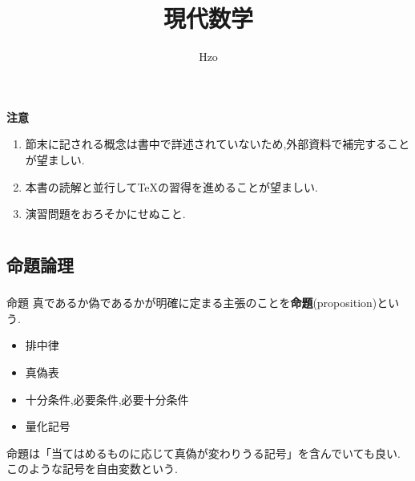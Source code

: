 \documentclass[dvipdfmx,b4j]{jsarticle}
\begin{document}
\title{現代数学}
\author{Hzo}
\maketitle

\begin{framed}
\textbf{注意}
\begin{enumerate}
    \item 節末に記される概念は書中で詳述されていないため,外部資料で補完することが望ましい.
    \item 本書の読解と並行して\TeX の習得を進めることが望ましい.
    \item 演習問題をおろそかにせぬこと.
\end{enumerate}
\end{framed}
\tableofcontents

\section{}
\subsection{命題論理}
\subsubsection{}
\begin{definition}{命題}{}
真であるか偽であるかが明確に定まる主張のことを\textbf{命題}(proposition)という.
\end{definition}
\begin{itemize}
  \item 排中律
  \item 真偽表
  \item 十分条件,必要条件,必要十分条件
  \item 量化記号
\end{itemize}

命題は「当てはめるものに応じて真偽が変わりうる記号」を含んでいても良い.このような記号を自由変数という.
%
\end{document}
